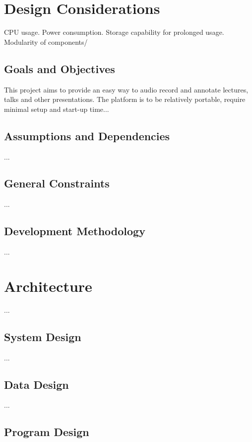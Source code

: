 \documentclass[11pt,a4paper,titlepage]{report}
\begin{document}
\section{Design Considerations}

CPU usage. Power consumption. Storage capability for prolonged usage. Modularity of components/


\subsection{Goals and Objectives}

This project aims to provide an easy way to audio record and annotate lectures, talks and other presentations. The platform is to be relatively portable, require minimal setup and start-up time...

\subsection{Assumptions and Dependencies}

...

\subsection{General Constraints}

...

\subsection{Development Methodology}

...

\section{Architecture}

...

\subsection{System Design}

...

\subsection{Data Design}

...

\subsection{Program Design}
\end{document}
